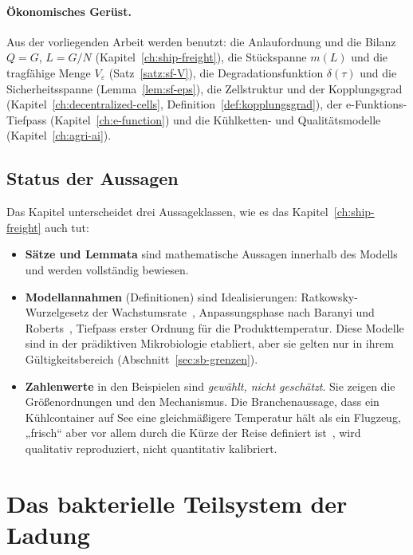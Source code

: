 \documentclass[a4paper, 12pt, twoside, openright]{report}
\theoremstyle{definition}
\theoremstyle{definition}
\begin{document}
\paragraph{Ökonomisches Gerüst.}
Aus der vorliegenden Arbeit werden benutzt: die Anlaufordnung und die Bilanz $Q=G$, $L=G/N$
(Kapitel~\ref{ch:ship-freight}), die Stückspanne $m(L)$ und die tragfähige Menge
$V_\varepsilon$ (Satz~\ref{satz:sf-V}), die Degradationsfunktion $\delta(\tau)$ und die
Sicherheitsspanne (Lemma~\ref{lem:sf-eps}), die Zellstruktur und der Kopplungsgrad
(Kapitel~\ref{ch:decentralized-cells}, Definition~\ref{def:kopplungsgrad}), der
e-Funktions-Tiefpass (Kapitel~\ref{ch:e-function}) und die Kühlketten- und Qualitätsmodelle
(Kapitel~\ref{ch:agri-ai}).

\subsection{Status der Aussagen}

Das Kapitel unterscheidet drei Aussageklassen, wie es das Kapitel~\ref{ch:ship-freight}
auch tut:
\begin{itemize}
  \item \textbf{Sätze und Lemmata} sind mathematische Aussagen innerhalb des Modells und
    werden vollständig bewiesen.
  \item \textbf{Modellannahmen} (Definitionen) sind Idealisierungen: Ratkowsky-Wurzelgesetz
    der Wachstumsrate~\cite{ratkowsky1982}, Anpassungsphase nach Baranyi und
    Roberts~\cite{baranyi1994}, Tiefpass erster Ordnung für die Produkttemperatur. Diese
    Modelle sind in der prädiktiven Mikrobiologie etabliert, aber sie gelten nur in ihrem
    Gültigkeitsbereich (Abschnitt~\ref{sec:sb-grenzen}).
  \item \textbf{Zahlenwerte} in den Beispielen sind \emph{gewählt, nicht geschätzt}. Sie
    zeigen die Größenordnungen und den Mechanismus. Die Branchenaussage, dass ein Kühlcontainer
    auf See eine gleichmäßigere Temperatur hält als ein Flugzeug, „frisch“ aber vor allem durch
    die Kürze der Reise definiert ist~\cite{loadstar_flowers}, wird qualitativ reproduziert,
    nicht quantitativ kalibriert.
\end{itemize}

\section{Das bakterielle Teilsystem der Ladung}
\label{sec:sb-system}
\end{document}
